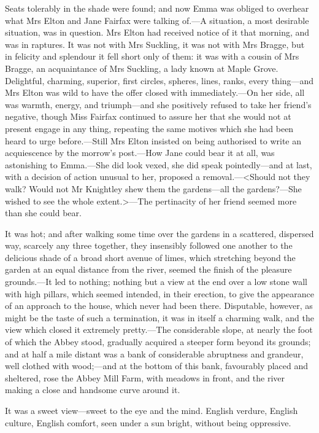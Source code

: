 Seats tolerably in the shade were found; and now Emma was obliged to overhear what Mrs Elton and Jane Fairfax were talking of.—A situation, a most desirable situation, was in question. Mrs Elton had received notice of it that morning, and was in raptures. It was not with Mrs Suckling, it was not with Mrs Bragge, but in felicity and splendour it fell short only of them: it was with a cousin of Mrs Bragge, an acquaintance of Mrs Suckling, a lady known at Maple Grove. Delightful, charming, superior, first circles, spheres, lines, ranks, every thing—and Mrs Elton was wild to have the offer closed with immediately.—On her side, all was warmth, energy, and triumph—and she positively refused to take her friend's negative, though Miss Fairfax continued to assure her that she would not at present engage in any thing, repeating the same motives which she had been heard to urge before.—Still Mrs Elton insisted on being authorised to write an acquiescence by the morrow's post.—How Jane could bear it at all, was astonishing to Emma.—She did look vexed, she did speak pointedly—and at last, with a decision of action unusual to her, proposed a removal.—<Should not they walk? Would not Mr Knightley shew them the gardens—all the gardens?—She wished to see the whole extent.>—The pertinacity of her friend seemed more than she could bear.

It was hot; and after walking some time over the gardens in a scattered, dispersed way, scarcely any three together, they insensibly followed one another to the delicious shade of a broad short avenue of limes, which stretching beyond the garden at an equal distance from the river, seemed the finish of the pleasure grounds.—It led to nothing; nothing but a view at the end over a low stone wall with high pillars, which seemed intended, in their erection, to give the appearance of an approach to the house, which never had been there. Disputable, however, as might be the taste of such a termination, it was in itself a charming walk, and the view which closed it extremely pretty.—The considerable slope, at nearly the foot of which the Abbey stood, gradually acquired a steeper form beyond its grounds; and at half a mile distant was a bank of considerable abruptness and grandeur, well clothed with wood;—and at the bottom of this bank, favourably placed and sheltered, rose the Abbey Mill Farm, with meadows in front, and the river making a close and handsome curve around it.

It was a sweet view—sweet to the eye and the mind. English verdure, English culture, English comfort, seen under a sun bright, without being oppressive.

